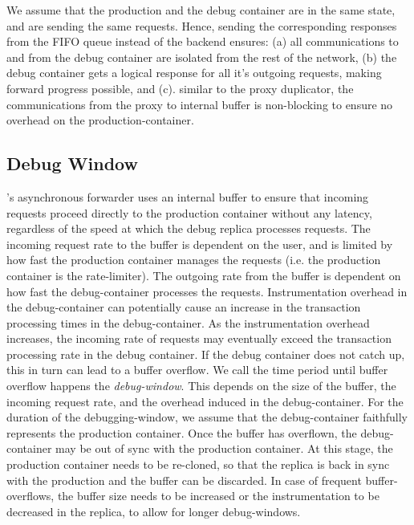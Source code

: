 We assume that the production and the debug container are in the same state, and are sending the same requests. 
Hence, sending the corresponding responses from the FIFO queue instead of the backend ensures:
(a) all communications to and from the debug container are isolated from the rest of the network,
(b) the debug container gets a logical response for all it's outgoing requests, making forward progress possible,
and (c). similar to the proxy duplicator, the communications from the proxy to internal buffer is non-blocking to ensure no overhead on the production-container.



\subsection{Debug Window}
\label{sec:parikshanWindow}

\parikshan's asynchronous forwarder uses an internal buffer to ensure that incoming requests proceed directly to the production container without any latency, regardless of the speed at which the debug replica processes requests.
The incoming request rate to the buffer is dependent on the user, and is limited by how fast the production container manages the requests (i.e. the production container is the rate-limiter).
The outgoing rate from the buffer is dependent on how fast the debug-container processes the requests.
Instrumentation overhead in the debug-container can potentially cause an increase in the transaction processing times in the debug-container.
As the instrumentation overhead increases, the incoming rate of requests may eventually exceed the transaction processing rate in the debug container.
If the debug container does not catch up, this in turn can lead to a buffer overflow. We call the time period until buffer overflow happens the \emph{debug-window}.
This depends on the size of the buffer, the incoming request rate, and the overhead induced in the debug-container. 
For the duration of the debugging-window, we assume that the debug-container faithfully represents the production container. 
Once the buffer has overflown, the debug-container may be out of sync with the production container. 
At this stage, the production container needs to be re-cloned, so that the replica is back in sync with the production and the buffer can be discarded.
In case of frequent buffer-overflows, the buffer size needs to be increased or the instrumentation to be decreased in the replica, to allow for longer debug-windows.

